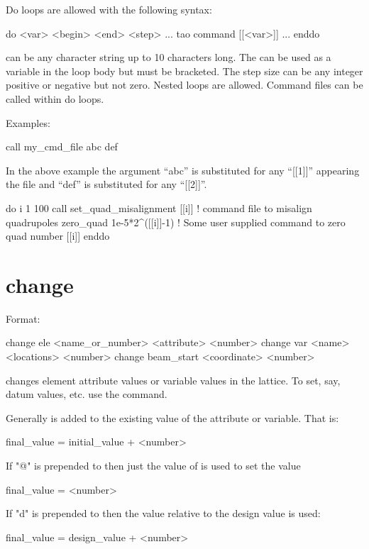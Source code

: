 Do loops are allowed with the following syntax:
\begin{example}
  do <var> <begin> <end> <step> 
    ...
    tao command [[<var>]]
    ...
  enddo
\end{example}
 can be any character string up to 10 characters long.
The  can be used as a variable in the loop body but must be
bracketed.  The step size can be any integer positive or negative but not zero.
Nested loops are allowed. Command files can be called within do loops.

Examples:
\begin{example}
    call my_cmd_file abc def 
\end{example}
In the above example the argument ``abc'' is substituted for any
``[[1]]'' appearing the file and ``def'' is substituted for any
``[[2]]''.
\Newline

\begin{example}
  do i 1 100
    call set_quad_misalignment [[i]] ! command file to misalign quadrupoles
    zero_quad 1e-5*2^([[i]]-1) ! Some user supplied command to zero quad number [[i]]
  enddo
\end{example}

\section{change}
\label{s:change}

Format:
\begin{example}
  change ele <name_or_number> <attribute> <number>
  change var <name> <locations> <number>
  change beam_start <coordinate> <number>
\end{example}

\vskip 0.2in 
 changes element attribute values or variable
values in the  lattice. To set, say, datum values, etc. use
the  command.

Generally  is added to the existing value of the
attribute or variable. That is:
\begin{example}
  final_value = initial_value + <number>
\end{example}
If "@" is prepended to  then just the value of
 is used to set the value
\begin{example}
  final_value = <number>
\end{example}
If "d" is prepended to  then the value relative to the design
value is used:
\begin{example}
  final_value = design_value + <number>
\end{example}

